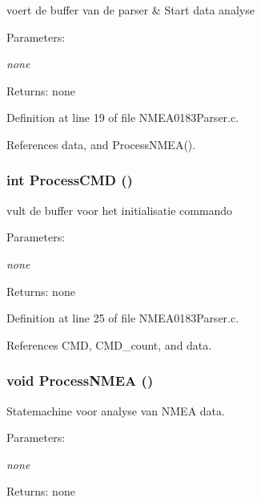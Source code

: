 voert de buffer van de parser \& Start data analyse 

\begin{Desc}
\item[Parameters:]
\begin{description}
\item[{\em none}]\end{description}
\end{Desc}
\begin{Desc}
\item[Returns:]none \end{Desc}


Definition at line 19 of file NMEA0183Parser.c.

References data, and ProcessNMEA().
\subsubsection{\setlength{\rightskip}{0pt plus 5cm}int ProcessCMD ()}\label{_n_m_e_a0183_parser_8h_571ac652c694e48662701b8e44793ed5}


vult de buffer voor het initialisatie commando 

\begin{Desc}
\item[Parameters:]
\begin{description}
\item[{\em none}]\end{description}
\end{Desc}
\begin{Desc}
\item[Returns:]none \end{Desc}


Definition at line 25 of file NMEA0183Parser.c.

References CMD, CMD\_\-count, and data.
\subsubsection{\setlength{\rightskip}{0pt plus 5cm}void ProcessNMEA ()}\label{_n_m_e_a0183_parser_8h_39017658d97fcb6a6c680dac1b5065ab}


Statemachine voor analyse van NMEA data. 

\begin{Desc}
\item[Parameters:]
\begin{description}
\item[{\em none}]\end{description}
\end{Desc}
\begin{Desc}
\item[Returns:]none \end{Desc}


